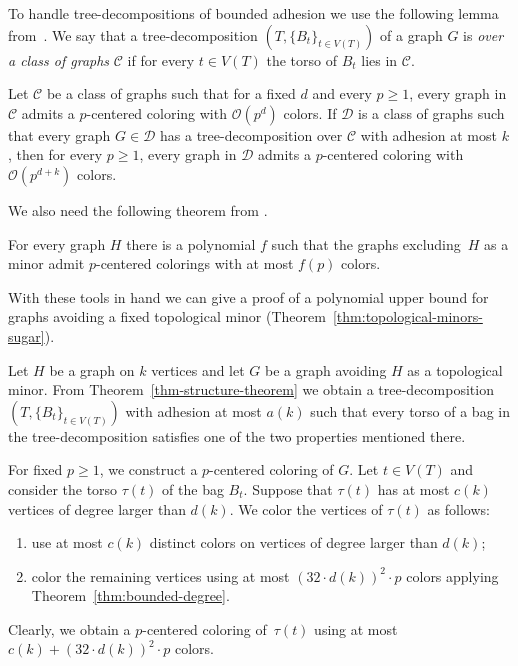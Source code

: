 To handle tree-decompositions of bounded adhesion we use 
the following lemma from~\cite{PS19}.
We say that a tree-decomposition $(T,\{B_t\}_{t\in V(T)})$ of a graph $G$ is \emph{over 
a class of graphs} $\mathcal{C}$ if for every $t\in V(T)$ 
the torso of $B_t$ lies in $\mathcal{C}$.

\begin{lemma}[\cite{PS19}]\label{lemma-lifting-through-bounded-adhesion}
  Let $\mathcal{C}$ be a class of graphs such that for a fixed $d$ and every
  $p\geq1$, every graph in $\mathcal{C}$ admits a $p$-centered coloring with
  $\mathcal{O}(p^d)$ colors.  If $\mathcal{D}$ is a class of graphs such that every
  graph $G\in\mathcal{D}$ has a tree-decomposition over $\mathcal{C}$ with
  adhesion at most $k$, then for every $p\geq1$, every graph in
  $\mathcal{D}$ admits a $p$-centered coloring with $\mathcal{O}(p^{d+k})$ colors.
\end{lemma}


We also need the following theorem from \cite{PS19}.

\begin{theorem}[\cite{PS19}]\label{theorem-proper-minor-closed}
For every graph $H$ there is a polynomial $f$ such that 
the graphs excluding~$H$ as a minor admit $p$-centered
colorings with at most $f(p)$ colors.
\end{theorem}

With these tools in hand we can give a proof of a polynomial upper bound 
for graphs avoiding a fixed topological minor (Theorem~\ref{thm:topological-minors-sugar}).

Let $H$ be a graph on $k$ vertices and 
let $G$ be a graph avoiding $H$ as a topological minor. From
Theorem~\ref{thm-structure-theorem} we obtain a tree-decomposition 
$(T,\{B_t\}_{t\in V(T)})$ with adhesion at most $a(k)$ such that
every torso of a bag in the tree-decomposition satisfies one of the two 
properties mentioned there.

For fixed $p\geq1$, we construct a $p$-centered coloring of $G$. 
Let $t\in V(T)$ and consider the torso $\tau(t)$ of the bag $B_t$.
Suppose that $\tau(t)$ has at most $c(k)$ vertices of degree larger than $d(k)$.
We color the vertices of $\tau(t)$ as follows:
\begin{enumerate}
\item use at most $c(k)$ distinct colors on vertices of degree larger than $d(k)$;
\item color the remaining vertices using at most $(32\cdot d(k))^2\cdot p$ colors 
applying Theorem~\ref{thm:bounded-degree}.
\end{enumerate}
Clearly, we obtain a $p$-centered coloring of~$\tau(t)$ using at most
$c(k)+(32\cdot d(k))^2\cdot p$ colors.

